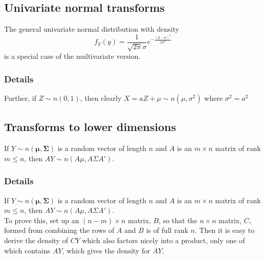 \documentclass[12pt,a4paper]{article}
\theoremstyle{regla}
\theoremstyle{remark}
\theoremstyle{definition}
\theoremstyle{nonumberbreak}
\begin{document}
\subsection{Univariate normal transforms}
\begin{fbox}
\begin{minipage}{0.97\textwidth}
The general univariate normal distribution with density 
$$
f_Y(y) = \frac{1}{\sqrt{2\pi}\sigma}e^{-\frac{(y-\mu)^2}{2\sigma^2}}
$$
is a special case of the multivariate version.
\end{minipage}
\end{fbox}
\subsubsection{Details}
Further, if $Z\sim n(0,1)$, then clearly $X=aZ+\mu \sim n(\mu,\sigma^2)$ where $\sigma^2=a^2$

\subsection{Transforms to lower dimensions}
\begin{fbox}
\begin{minipage}{0.97\textwidth}
If $Y\sim n \left ( \boldsymbol{\mu},\boldsymbol{\Sigma} \right )$ is a random vector of length $n$ and $A$ is an $m\times n$ matrix of rank $m\leq n$, then $AY \sim n(A\mu,A\Sigma A')$. 
\end{minipage}
\end{fbox}
\subsubsection{Details}
If $Y\sim n \left ( \boldsymbol{\mu},\boldsymbol{\Sigma} \right )$ is a random vector of length $n$ and $A$ is an $m\times n$ matrix of rank $m\leq n$, then $AY \sim n(A\mu,A\Sigma A')$. \\

To prove this, set up an $(n-m)\times n$ matrix, $B$, so that the $n\times n$ matrix, $C$, formed from combining the rows of $A$ and $B$ is of full rank $n$. Then it is easy to derive the density of $CY$ which also factors nicely into a product, only one of which contains $AY$, which gives the density for $AY$.

\end{document}
